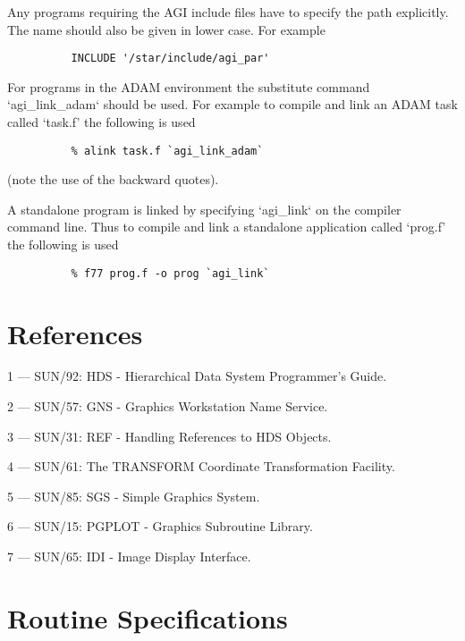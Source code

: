 Any programs requiring the AGI include files have to specify the path
explicitly. The name should also be given in lower case. For example
\begin{verbatim}
          INCLUDE '/star/include/agi_par'
\end{verbatim}

For programs in the ADAM environment the substitute command `agi\_link\_adam`
should be used. For example to compile and link an ADAM task called `task.f'
the following is used
\begin{verbatim}
          % alink task.f `agi_link_adam`
\end{verbatim}
(note the use of the backward quotes).

A standalone program is linked by specifying `agi\_link` on the compiler
command line. Thus to compile and link a standalone application called
`prog.f' the following is used
\begin{verbatim}
          % f77 prog.f -o prog `agi_link`
\end{verbatim}

\section {References}

1 --- SUN/92: HDS - Hierarchical Data System Programmer's Guide.

2 --- SUN/57: GNS - Graphics Workstation Name Service.

3 --- SUN/31: REF - Handling References to HDS Objects.

4 --- SUN/61: The TRANSFORM Coordinate Transformation Facility.

5 --- SUN/85: SGS - Simple Graphics System.

6 --- SUN/15: PGPLOT - Graphics Subroutine Library.

7 --- SUN/65: IDI - Image Display Interface.

\newpage

\section {Routine Specifications}





